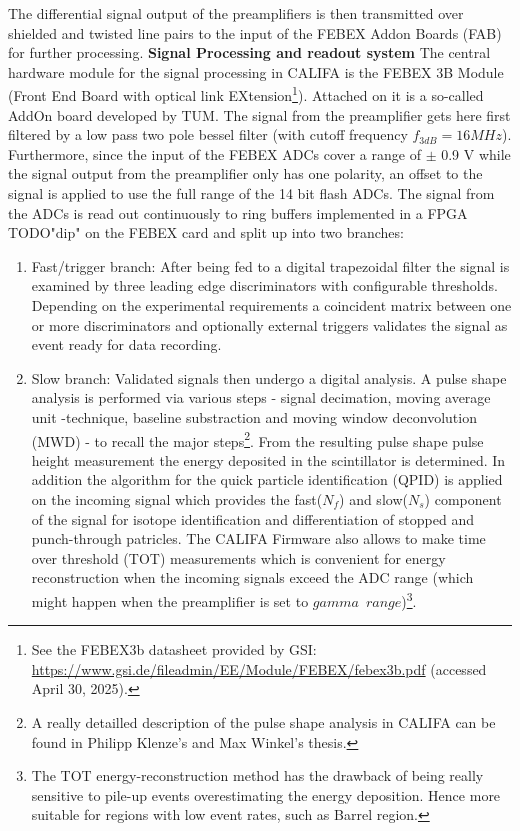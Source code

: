 The differential signal output of the preamplifiers is then transmitted over shielded and twisted line pairs to the input of the FEBEX Addon Boards (FAB) for further processing.\newline
\textbf{Signal Processing and readout system}\newline
The central hardware module for the signal processing in CALIFA is the FEBEX 3B Module (Front End Board with optical link EXtension\footnote{See the FEBEX3b datasheet provided by GSI: \url{https://www.gsi.de/fileadmin/EE/Module/FEBEX/febex3b.pdf} (accessed April 30, 2025).}). Attached on it is a so-called AddOn board developed by TUM. The signal from the preamplifier gets here first filtered by a low pass two pole bessel filter (with cutoff frequency $f_{3dB} = 16 MHz$). Furthermore, since the input of the FEBEX ADCs cover a range of $\pm$ 0.9 V while the signal output from the preamplifier only has one polarity, an offset to the signal is applied to use the full range of the 14 bit flash ADCs. The signal from the ADCs is read out continuously to ring buffers implemented in a FPGA TODO"dip" on the FEBEX card and split up into two branches:\newline
\begin{enumerate}
\item Fast/trigger branch: After being fed to a digital trapezoidal filter the signal is examined by three leading edge discriminators with configurable thresholds. Depending on the experimental requirements a coincident matrix between one or more discriminators and optionally external triggers validates the signal as event ready for data recording.
\item Slow branch: Validated signals then undergo a digital analysis. A pulse shape analysis is performed via various steps - signal decimation, moving average unit -technique, baseline substraction and moving window deconvolution (MWD) - to recall the major steps\footnote{A really detailled description of the pulse shape analysis in CALIFA can be found in Philipp Klenze's\cite{pklenze} and Max Winkel's thesis\cite{winkel2016komplexe}.}. From the resulting pulse shape pulse height measurement the energy deposited in the scintillator is determined. In addition the algorithm for the quick particle identification (QPID) is applied on the incoming signal which provides the fast($N_{f}$) and slow($N_{s}$) component of the signal for isotope identification and differentiation of stopped and punch-through patricles. The CALIFA Firmware also allows to make time over threshold (TOT) measurements which is convenient for energy reconstruction when the incoming signals exceed the ADC range (which might happen when the preamplifier is set to $gamma \enspace range$)\footnote{The TOT energy-reconstruction method has the drawback of being really sensitive to pile-up events overestimating the energy deposition. Hence more suitable for regions with low event rates, such as Barrel region.}.
\end{enumerate}

